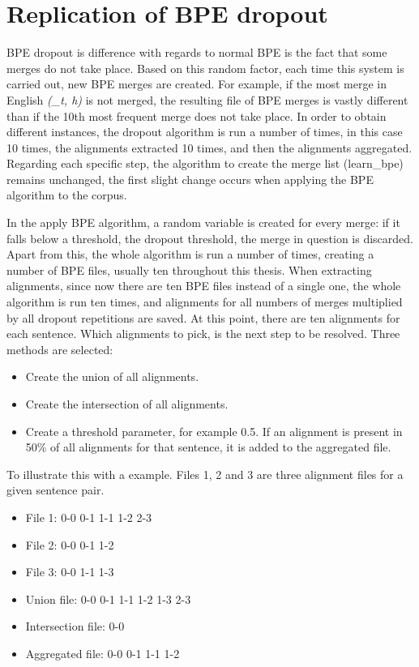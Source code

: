 \clearpage
\section{Replication of BPE dropout}\label{met:replbpedrop}

BPE dropout is difference with regards to normal BPE is the fact that some merges do not take place. Based on this random factor, each time this system is carried out, new BPE merges are created. For example, if the most merge in English \emph{(\_t, h)} is not merged, the resulting file of BPE merges is vastly different than if the 10th most frequent merge does not take place. In order to obtain different instances, the dropout algorithm is run a number of times, in this case 10 times, the alignments extracted 10 times, and then the alignments aggregated. Regarding each specific step, the algorithm to create the merge list (learn\_bpe) remains unchanged, the first slight change occurs when applying the BPE algorithm to the corpus.

In the apply BPE algorithm, a random variable is created for every merge: if it falls below a threshold, the dropout threshold, the merge in question is discarded. Apart from this, the whole algorithm is run a number of times, creating a number of BPE files, usually ten throughout this thesis. When extracting alignments, since now there are ten BPE files instead of a single one, the whole algorithm is run ten times, and alignments for all numbers of merges multiplied by all dropout repetitions are saved. At this point, there are ten alignments for each sentence. Which alignments to pick, is the next step to be resolved. Three methods are selected:

\begin{itemize}
	\item Create the union of all alignments.
	\item Create the intersection of all alignments.
	\item Create a threshold parameter, for example 0.5. If an alignment is present in 50\% of all alignments for that sentence, it is added to the aggregated file.
\end{itemize}

To illustrate this with a example. Files 1, 2 and 3 are three alignment files for a given sentence pair.

\begin{itemize}
	\item File 1: 0-0 0-1 1-1 1-2 2-3
	\item File 2: 0-0 0-1 1-2
	\item File 3: 0-0 1-1 1-3
	\item Union file: 0-0 0-1 1-1 1-2 1-3 2-3
	\item Intersection file: 0-0
	\item Aggregated file: 0-0 0-1 1-1 1-2
\end{itemize}

